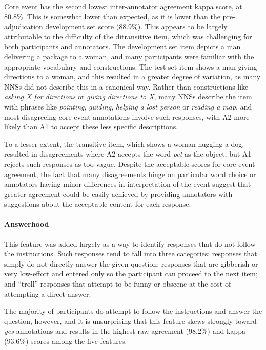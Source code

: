 \documentclass[11pt,a4paper]{article}
\begin{document}
Core event has the second lowest inter-annotator agreement kappa score, at 80.8\%. This is somewhat lower than expected, as it is lower than the pre-adjudication development set score (88.9\%). This appears to be largely attributable to the difficulty of the ditransitive item, which was challenging for both participants and annotators. The development set item depicts a man delivering a package to a woman, and many participants were familiar with the appropriate vocabulary and constructions. The test set item shows a man giving directions to a woman, and this resulted in a greater degree of variation, as many NNSs did not describe this in a canonical way.  Rather than constructions like \textit{asking X for directions} or \textit{giving directions to X}, many NNSs describe the item with phrases like \textit{pointing}, \textit{guiding}, \textit{helping a lost person} or \textit{reading a map}, and most disagreeing core event annotations involve such responses, with A2 more likely than A1 to accept these less specific descriptions.

To a lesser extent, the transitive item, which shows a woman hugging a dog, resulted in disagreements where A2 accepts the word \textit{pet} as the object, but A1 rejects such responses as too vague. Despite the acceptable scores for core event agreement, the fact that many disagreements hinge on particular word choice or annotators having minor differences in interpretation of the event suggest that greater agreement could be easily achieved by providing annotators with suggestions about the acceptable content for each response. 

\paragraph{Answerhood} This feature was added largely as a way to identify responses that do not follow the instructions. Such responses tend to fall into three categories: responses that simply do not directly answer the given question; responses that are gibberish or very low-effort and entered only so the participant can proceed to the next item; and ``troll'' responses that attempt to be funny or obscene at the cost of attempting a direct answer.

The majority of participants do attempt to follow the instructions and answer the question, however, and it is unsurprising that this feature skews strongly toward \textit{yes} annotations and results in the highest raw agreement (98.2\%) and kappa (93.6\%) scores among the five features.
\end{document}
